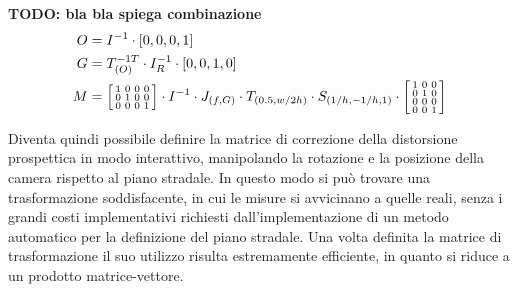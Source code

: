 \textbf{TODO: bla bla spiega combinazione}
\begin{equation}
    \begin{aligned}
        O & = I^{-1} \cdot [0, 0, 0, 1]                       \\
        G & = T_{(O)}^{-1T} \cdot I_R^{-1} \cdot [0, 0, 1, 0] \\
        M & =
        \begin{bsmallmatrix}
            1 & 0 & 0 & 0 \\
            0 & 1 & 0 & 0 \\
            0 & 0 & 0 & 1 \\
        \end{bsmallmatrix}
        \cdot I^{-1} \cdot J_{(f, G)} \cdot T_{(0.5, w/2h)} \cdot S_{(1/h, -1/h, 1)} \cdot
        \begin{bsmallmatrix}
            1 & 0 & 0 \\
            0 & 1 & 0 \\
            0 & 0 & 0 \\
            0 & 0 & 1 \\
        \end{bsmallmatrix}                                   \\
    \end{aligned}
\end{equation}

Diventa quindi possibile definire la matrice di correzione della distorsione prospettica in modo interattivo, manipolando la rotazione e la posizione della camera rispetto al piano stradale.
In questo modo si può trovare una trasformazione soddisfacente, in cui le misure si avvicinano a quelle reali, senza i grandi costi implementativi richiesti dall'implementazione di un metodo automatico per la definizione del piano stradale.
Una volta definita la matrice di trasformazione il suo utilizzo risulta estremamente efficiente, in quanto si riduce a un prodotto matrice-vettore.
